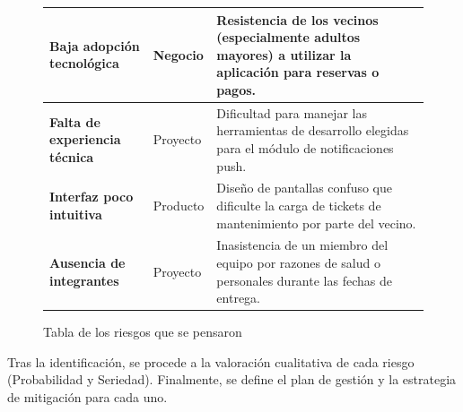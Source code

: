 \begin{figure}[H]
\begin{tabularx}{\textwidth}{|p{5cm}|p{3cm}|X|}
    \\ \hline
    
            \textbf{Baja adopción tecnológica} 
        
        & 
        
            Negocio 
        
        & 
        
            Resistencia de los vecinos (especialmente adultos mayores) a utilizar la aplicación para reservas o pagos. 
        
    \\ \hline
    
            \textbf{Falta de experiencia técnica} 
        
        & 
        
            Proyecto 
        
        & 
        
            Dificultad para manejar las herramientas de desarrollo elegidas para el módulo de notificaciones push. 
        
    \\ \hline
    
            \textbf{Interfaz poco intuitiva} 
        
        & 
        
            Producto 
        
        & 
        
            Diseño de pantallas confuso que dificulte la carga de tickets de mantenimiento por parte del vecino. 
        
    \\ \hline
    
            \textbf{Ausencia de integrantes} 
        
        & 
        
            Proyecto 
        
        & 
        
            Inasistencia de un miembro del equipo por razones de salud o personales durante las fechas de entrega. 
        
    \\ \hline
    \end{tabularx}
    \caption{Tabla de los riesgos que se pensaron}
\end{figure}

Tras la identificación, se procede a la valoración cualitativa de cada riesgo (Probabilidad y Seriedad). Finalmente, se define el plan de gestión y la estrategia de mitigación para cada uno.

